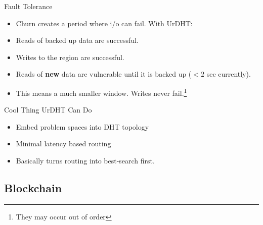 \documentclass[11pt]{beamer}
\begin{document}
\begin{frame}{Fault Tolerance}
	\begin{itemize}
		\item Churn creates a period where i/o can fail.  With UrDHT:
		\item Reads of backed up data are successful.
		\item Writes to the region are successful. 
		\item Reads of \textbf{new} data are vulnerable until it is backed up ($<2$ sec currently).
		\item This means a much smaller window.  Writes never fail.\footnote{They may occur out of order}
	\end{itemize}

\end{frame}


\begin{frame}{Cool Thing UrDHT Can Do}
	\begin{itemize}
		\item Embed problem spaces into DHT topology
		\item Minimal latency based routing
		\item Basically turns routing into best-search first.
		
	\end{itemize}
\end{frame}



\subsection{Blockchain}
\end{document}
